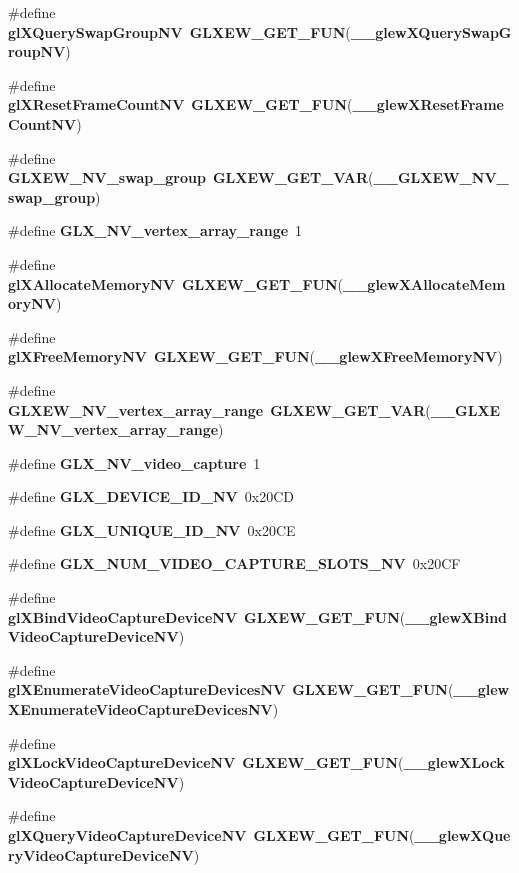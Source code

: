 \begin{DoxyCompactItemize}
\item 
\#define {\bf gl\+X\+Query\+Swap\+Group\+NV}~{\bf G\+L\+X\+E\+W\+\_\+\+G\+E\+T\+\_\+\+F\+UN}({\bf \+\_\+\+\_\+glew\+X\+Query\+Swap\+Group\+NV})
\item 
\#define {\bf gl\+X\+Reset\+Frame\+Count\+NV}~{\bf G\+L\+X\+E\+W\+\_\+\+G\+E\+T\+\_\+\+F\+UN}({\bf \+\_\+\+\_\+glew\+X\+Reset\+Frame\+Count\+NV})
\item 
\#define {\bf G\+L\+X\+E\+W\+\_\+\+N\+V\+\_\+swap\+\_\+group}~{\bf G\+L\+X\+E\+W\+\_\+\+G\+E\+T\+\_\+\+V\+AR}({\bf \+\_\+\+\_\+\+G\+L\+X\+E\+W\+\_\+\+N\+V\+\_\+swap\+\_\+group})
\item 
\#define {\bf G\+L\+X\+\_\+\+N\+V\+\_\+vertex\+\_\+array\+\_\+range}~1
\item 
\#define {\bf gl\+X\+Allocate\+Memory\+NV}~{\bf G\+L\+X\+E\+W\+\_\+\+G\+E\+T\+\_\+\+F\+UN}({\bf \+\_\+\+\_\+glew\+X\+Allocate\+Memory\+NV})
\item 
\#define {\bf gl\+X\+Free\+Memory\+NV}~{\bf G\+L\+X\+E\+W\+\_\+\+G\+E\+T\+\_\+\+F\+UN}({\bf \+\_\+\+\_\+glew\+X\+Free\+Memory\+NV})
\item 
\#define {\bf G\+L\+X\+E\+W\+\_\+\+N\+V\+\_\+vertex\+\_\+array\+\_\+range}~{\bf G\+L\+X\+E\+W\+\_\+\+G\+E\+T\+\_\+\+V\+AR}({\bf \+\_\+\+\_\+\+G\+L\+X\+E\+W\+\_\+\+N\+V\+\_\+vertex\+\_\+array\+\_\+range})
\item 
\#define {\bf G\+L\+X\+\_\+\+N\+V\+\_\+video\+\_\+capture}~1
\item 
\#define {\bf G\+L\+X\+\_\+\+D\+E\+V\+I\+C\+E\+\_\+\+I\+D\+\_\+\+NV}~0x20\+CD
\item 
\#define {\bf G\+L\+X\+\_\+\+U\+N\+I\+Q\+U\+E\+\_\+\+I\+D\+\_\+\+NV}~0x20\+CE
\item 
\#define {\bf G\+L\+X\+\_\+\+N\+U\+M\+\_\+\+V\+I\+D\+E\+O\+\_\+\+C\+A\+P\+T\+U\+R\+E\+\_\+\+S\+L\+O\+T\+S\+\_\+\+NV}~0x20\+CF
\item 
\#define {\bf gl\+X\+Bind\+Video\+Capture\+Device\+NV}~{\bf G\+L\+X\+E\+W\+\_\+\+G\+E\+T\+\_\+\+F\+UN}({\bf \+\_\+\+\_\+glew\+X\+Bind\+Video\+Capture\+Device\+NV})
\item 
\#define {\bf gl\+X\+Enumerate\+Video\+Capture\+Devices\+NV}~{\bf G\+L\+X\+E\+W\+\_\+\+G\+E\+T\+\_\+\+F\+UN}({\bf \+\_\+\+\_\+glew\+X\+Enumerate\+Video\+Capture\+Devices\+NV})
\item 
\#define {\bf gl\+X\+Lock\+Video\+Capture\+Device\+NV}~{\bf G\+L\+X\+E\+W\+\_\+\+G\+E\+T\+\_\+\+F\+UN}({\bf \+\_\+\+\_\+glew\+X\+Lock\+Video\+Capture\+Device\+NV})
\item 
\#define {\bf gl\+X\+Query\+Video\+Capture\+Device\+NV}~{\bf G\+L\+X\+E\+W\+\_\+\+G\+E\+T\+\_\+\+F\+UN}({\bf \+\_\+\+\_\+glew\+X\+Query\+Video\+Capture\+Device\+NV})

\end{DoxyCompactItemize}
